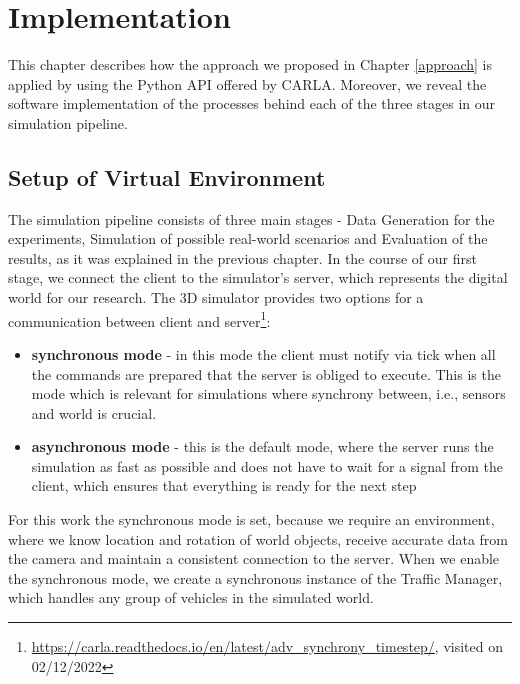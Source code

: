 \chapter{Implementation} \label{implementation}
This chapter describes how the approach we proposed in Chapter \ref{approach} is applied by using the Python API offered by CARLA. Moreover, we reveal the software implementation of the processes behind each of the three stages in our simulation pipeline.  

\section{Setup of Virtual Environment}
The simulation pipeline consists of three main stages - Data Generation for the experiments, Simulation of possible real-world scenarios and Evaluation of the results, as it was explained in the previous chapter. In the course of our first stage, we connect the client to the simulator's server, which represents the digital world for our research. The 3D simulator provides two options for a communication between client and server\footnote{\url{https://carla.readthedocs.io/en/latest/adv_synchrony_timestep/}, visited on 02/12/2022}:
\begin{itemize}
    \item \textbf{synchronous mode} - in this mode the client must notify via tick when all the commands are prepared that the server is obliged to execute. This is the mode which is relevant for simulations where synchrony between, i.e., sensors and world is crucial. 
    \item \textbf{asynchronous mode} - this is the default mode, where the server runs the simulation as fast as possible and does not have to wait for a signal from the client, which ensures that everything is ready for the next step 
\end{itemize}

For this work the synchronous mode is set, because we require an environment, where we know location and rotation of world objects, receive accurate data from the camera and maintain a consistent connection to the server. When we enable the synchronous mode, we create a synchronous instance of the Traffic Manager, which handles any group of vehicles in the simulated world.

